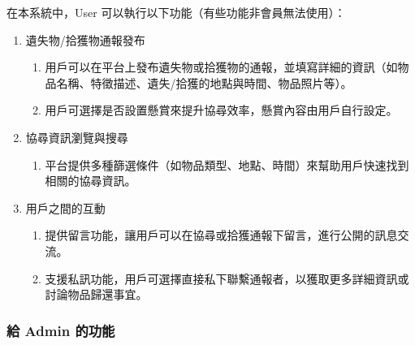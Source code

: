 \documentclass[12pt,a4paper]{article}
\begin{document}
在本系統中，User 可以執行以下功能（有些功能非會員無法使用）：
\begin{enumerate}
\item 

遺失物/拾獲物通報發布
\begin{enumerate}
    \item 用戶可以在平台上發布遺失物或拾獲物的通報，並填寫詳細的資訊（如物品名稱、特徵描述、遺失/拾獲的地點與時間、物品照片等）。
    \item 用戶可選擇是否設置懸賞來提升協尋效率，懸賞內容由用戶自行設定。
\end{enumerate}

\item 

協尋資訊瀏覽與搜尋
\begin{enumerate}
    \item 平台提供多種篩選條件（如物品類型、地點、時間）來幫助用戶快速找到相關的協尋資訊。
\end{enumerate}

\item 

用戶之間的互動
\begin{enumerate}
    \item 提供留言功能，讓用戶可以在協尋或拾獲通報下留言，進行公開的訊息交流。
    \item 支援私訊功能，用戶可選擇直接私下聯繫通報者，以獲取更多詳細資訊或討論物品歸還事宜。
\end{enumerate}


\end{enumerate}

   
\subsubsection{給 Admin 的功能}
\end{document}
